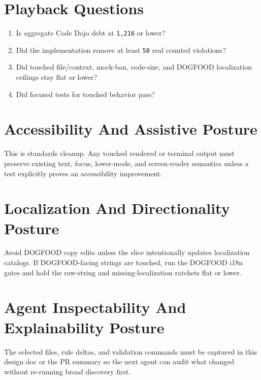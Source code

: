 \section{Playback Questions}\label{record-231-playback-questions}

\begin{enumerate}
\def\labelenumi{\arabic{enumi}.}
\tightlist
\item
  Is aggregate Code Dojo debt at \texttt{1\allowbreak{},\allowbreak{}2\allowbreak{}1\allowbreak{}6} or lower?
\item
  Did the implementation remove at least \texttt{5\allowbreak{}0} real counted violations?
\item
  Did touched file/context, mock-ban, code-size, and DOGFOOD localization ceilings stay flat or lower?
\item
  Did focused tests for touched behavior pass?
\end{enumerate}

\section{Accessibility And Assistive Posture}\label{record-231-accessibility-and-assistive-posture}

This is standards cleanup. Any touched rendered or terminal output must preserve existing text, focus, lower-mode, and screen-reader semantics unless a test explicitly proves an accessibility improvement.

\section{Localization And Directionality Posture}\label{record-231-localization-and-directionality-posture}

Avoid DOGFOOD copy edits unless the slice intentionally updates localization catalogs. If DOGFOOD-facing strings are touched, run the DOGFOOD i18n gates and hold the raw-string and missing-localization ratchets flat or lower.

\section{Agent Inspectability And Explainability Posture}\label{record-231-agent-inspectability-and-explainability-posture}

The selected files, rule deltas, and validation commands must be captured in this design doc or the PR summary so the next agent can audit what changed without re-running broad discovery first.

